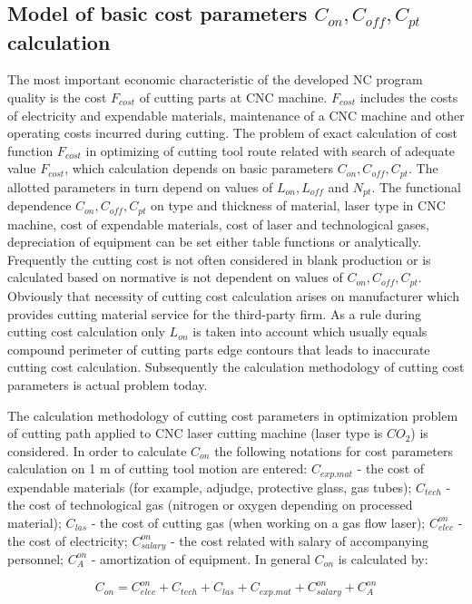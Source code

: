 \documentclass[runningheads]{llncs}
\begin{document}
\subsection{Model of basic cost parameters $C_{on}, C_{off}, C_{pt}$ calculation}

The most important economic characteristic of the developed NC program quality is the cost $F_{cost}$
of cutting parts at CNC machine.
$F_{cost}$ includes the costs of electricity and expendable materials,
maintenance of a CNC machine and other operating costs incurred during cutting.
The problem of exact calculation of cost function $F_{cost}$
in optimizing of cutting tool route related with search of adequate value  $F_{cost}$,
which calculation depends on basic parameters $C_{on}, C_{off}, C_{pt}$.
The allotted parameters in turn depend on values of
$L_{on}, L_{off}$ and $N_{pt}$.
The functional dependence
$C_{on}, C_{off}, C_{pt}$
on type and thickness of material,
laser type in CNC machine,
cost of expendable materials,
cost of laser and technological gases,
depreciation of equipment
can be set either table functions or analytically.
Frequently the cutting cost is not often considered in blank production
or is calculated based on normative is not dependent on values of
$C_{on}, C_{off}, C_{pt}$.
Obviously that necessity of cutting cost calculation
arises on manufacturer which provides
cutting material service for the third-party firm.
As a rule during cutting cost calculation only
$L_{on}$
is taken into account
which usually equals compound perimeter of cutting parts edge contours
that leads to inaccurate cutting cost calculation.
Subsequently the calculation methodology of cutting cost parameters
is actual problem today.

The calculation methodology of
cutting cost parameters
in optimization problem of cutting path applied to CNC laser cutting machine
(laser type is $CO_2$)
is considered.
In order to calculate $C_{on}$
the following notations for cost parameters calculation on 1 m of cutting tool motion are entered:
$C_{exp.mat}$ - the cost of expendable materials
(for example, adjudge, protective glass, gas tubes);
$C_{tech}$  - the cost of technological gas
(nitrogen or oxygen depending on processed material);
$C_{las}$ - the cost of cutting gas
(when working on a gas flow laser);
$C^{on}_{elec}$ - the cost of electricity;
$C^{on}_{salary}$ - the cost related with salary of accompanying personnel;
$C^{on}_A$ - amortization of equipment.
In general
$C_{on}$
is calculated by:

\begin{equation}
C_{on} =
C^{on}_{elec} + C_{tech} + C_{las} + C_{exp.mat} + C^{on}_{salary} + C^{on}_A
\label{eq1.3}
\end{equation}
\end{document}
